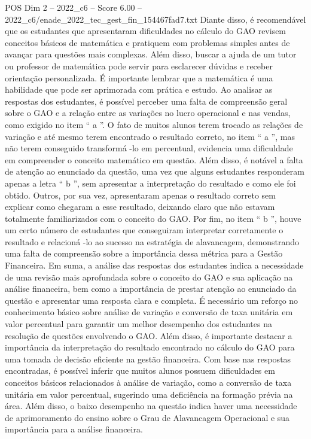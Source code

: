 \begin{textsample}{POS Dim 2 – 2022\_c6 – Score 6.00 – 2022\_c6/enade\_2022\_tec\_gest\_fin\_154467fad7.txt}
Diante disso, é recomendável que os estudantes que apresentaram dificuldades no cálculo do GAO revisem conceitos básicos de matemática e pratiquem com problemas simples antes de avançar para questões mais complexas.
Além disso, buscar a ajuda de um tutor ou professor de matemática pode servir para esclarecer dúvidas e receber orientação personalizada.
É importante lembrar que a matemática é uma habilidade que pode ser aprimorada com prática e estudo.
Ao analisar as respostas dos estudantes, é possível perceber uma falta de compreensão geral sobre o GAO e a relação entre as variações no lucro operacional e nas vendas, como exigido no item “ a ”.
O fato de muitos alunos terem trocado as relações de variação e até mesmo terem encontrado o resultado correto, no item “ a ”, mas não terem conseguido transformá -lo em percentual, evidencia uma dificuldade em compreender o conceito matemático em questão.
Além disso, é notável a falta de atenção ao enunciado da questão, uma vez que alguns estudantes responderam apenas a letra “ b ”, sem apresentar a interpretação do resultado e como ele foi obtido.
Outros, por sua vez, apresentaram apenas o resultado correto sem explicar como chegaram a esse resultado, deixando claro que não estavam totalmente familiarizados com o conceito do GAO.
Por fim, no item “ b ”, houve um certo número de estudantes que conseguiram interpretar corretamente o resultado e relacioná -lo ao sucesso na estratégia de alavancagem, demonstrando uma falta de compreensão sobre a importância dessa métrica para a Gestão Financeira.
Em suma, a análise das respostas dos estudantes indica a necessidade de uma revisão mais aprofundada sobre o conceito do GAO e sua aplicação na análise financeira, bem como a importância de prestar atenção ao enunciado da questão e apresentar uma resposta clara e completa.
É necessário um reforço no conhecimento básico sobre análise de variação e conversão de taxa unitária em valor percentual para garantir um melhor desempenho dos estudantes na resolução de questões envolvendo o GAO.
Além disso, é importante destacar a importância da interpretação do resultado encontrado no cálculo do GAO para uma tomada de decisão eficiente na gestão financeira.
Com base nas respostas encontradas, é possível inferir que muitos alunos possuem dificuldades em conceitos básicos relacionados à análise de variação, como a conversão de taxa unitária em valor percentual, sugerindo uma deficiência na formação prévia na área.
Além disso, o baixo desempenho na questão indica haver uma necessidade de aprimoramento do ensino sobre o Grau de Alavancagem Operacional e sua importância para a análise financeira.

\end{textsample}
